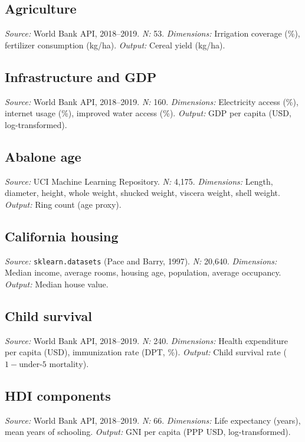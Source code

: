 \documentclass[12pt, a4paper]{article}
\theoremstyle{definition}
\theoremstyle{remark}
\begin{document}
\subsection{Agriculture}
\textit{Source:} World Bank API, 2018--2019. \textit{N:} 53. \textit{Dimensions:} Irrigation coverage (\%), fertilizer consumption (kg/ha). \textit{Output:} Cereal yield (kg/ha).

\subsection{Infrastructure and GDP}
\textit{Source:} World Bank API, 2018--2019. \textit{N:} 160. \textit{Dimensions:} Electricity access (\%), internet usage (\%), improved water access (\%). \textit{Output:} GDP per capita (USD, log-transformed).

\subsection{Abalone age}
\textit{Source:} UCI Machine Learning Repository. \textit{N:} 4,175. \textit{Dimensions:} Length, diameter, height, whole weight, shucked weight, viscera weight, shell weight. \textit{Output:} Ring count (age proxy).

\subsection{California housing}
\textit{Source:} \texttt{sklearn.datasets} (Pace and Barry, 1997). \textit{N:} 20,640. \textit{Dimensions:} Median income, average rooms, housing age, population, average occupancy. \textit{Output:} Median house value.

\subsection{Child survival}
\textit{Source:} World Bank API, 2018--2019. \textit{N:} 240. \textit{Dimensions:} Health expenditure per capita (USD), immunization rate (DPT, \%). \textit{Output:} Child survival rate ($1 - \text{under-5 mortality}$).

\subsection{HDI components}
\textit{Source:} World Bank API, 2018--2019. \textit{N:} 66. \textit{Dimensions:} Life expectancy (years), mean years of schooling. \textit{Output:} GNI per capita (PPP USD, log-transformed).
\end{document}

